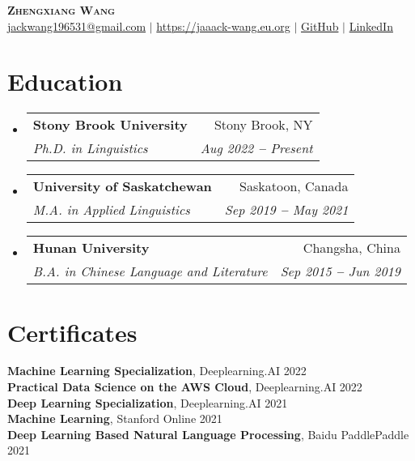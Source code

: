 \documentclass[letterpaper,11pt]{article}
\makeatletter
\newcommand{\resumeSubheading}[4]{
  \vspace{-2pt}\item
    \begin{tabular*}{0.97\textwidth}[t]{l@{\extracolsep{\fill}}r}
      \textbf{#1} & #2 \\
      \textit{\small#3} & \textit{\small #4} \\
    \end{tabular*}\vspace{-7pt}
}
\newcommand{\resumeSubHeadingListStart}{\begin{itemize}[leftmargin=0.15in, label={}]}
\newcommand{\resumeSubHeadingListEnd}{\end{itemize}}
\makeatother
\begin{document}

\begin{center}
    \textbf{\Huge \scshape Zhengxiang Wang} \\ \vspace{3pt}
    \small
    \faEnvelope \hspace{.5pt} \href{mailto:jackwang196531@gmail.com}{jackwang196531@gmail.com}
    $|$
    \faHome \hspace{.5pt} \href{https://jaaack-wang.eu.org}{https://jaaack-wang.eu.org}
    $|$
    \faGithub \hspace{.5pt} \href{https://github.com/jaaack-wang}{GitHub}
    $|$
    \faLinkedinSquare \hspace{.5pt} \href{https://www.linkedin.com/in/zhengxiang-wang-560735191/}{LinkedIn}
    
\end{center}



\section{Education}
  \resumeSubHeadingListStart
    
    \resumeSubheading
      {Stony Brook University}{Stony Brook, NY}
      {Ph.D. in Linguistics}{Aug 2022 \textbf{--} Present}

    \vspace{3pt}
    \resumeSubheading
      {University of Saskatchewan}{Saskatoon, Canada}
      {M.A. in Applied Linguistics}{Sep 2019 \textbf{--} May 2021}
      
    \vspace{3pt}
    \resumeSubheading
      {Hunan University}{Changsha, China}
      {B.A. in Chinese Language and Literature}{Sep 2015 \textbf{--} Jun 2019}
    
  \resumeSubHeadingListEnd



\section{Certificates}
  \resumeSubHeadingListStart
    \small{\item{
        \textbf{Machine Learning Specialization}, Deeplearning.AI \hfill 2022 \\ \vspace{1pt}
        \textbf{Practical Data Science on the AWS Cloud}, Deeplearning.AI \hfill 2022 \\ \vspace{1pt}
        \textbf{Deep Learning Specialization}, Deeplearning.AI \hfill 2021 \\ \vspace{1pt}
        \textbf{Machine Learning}, Stanford Online \hfill 2021 \\ \vspace{1pt}
        \textbf{Deep Learning Based Natural Language Processing}, Baidu PaddlePaddle \hfill 2021
    }} 
  \resumeSubHeadingListEnd
 
\end{document}
